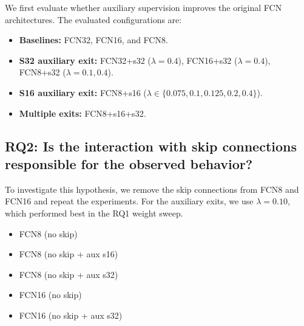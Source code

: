 \documentclass[runningheads]{llncs}
\begin{document}
    

    We first evaluate whether auxiliary supervision improves the original FCN architectures. The evaluated configurations are:

    \begin{itemize}
    \item \textbf{Baselines:} FCN32, FCN16, and FCN8.
    \item \textbf{S32 auxiliary exit:} FCN32+s32 ($\lambda=0.4$), FCN16+s32 ($\lambda=0.4$), FCN8+s32 ($\lambda=0.1,0.4$).
    \item \textbf{S16 auxiliary exit:} FCN8+s16 ($\lambda\in\{0.075,0.1,0.125,0.2,0.4\}$).
    \item \textbf{Multiple exits:} FCN8+s16+s32.
    \end{itemize}

    
    \subsection{RQ2: Is the interaction with skip connections responsible for the observed behavior?}
    
    To investigate this hypothesis, we remove the skip connections from FCN8 and FCN16
    and repeat the experiments. For the auxiliary exits, we use $\lambda=0.10$, which performed best in the RQ1 weight sweep.
    \begin{itemize}
        \item FCN8 (no skip)
        \item FCN8 (no skip + aux s16)
        \item FCN8 (no skip + aux s32)
        \item FCN16 (no skip)
        \item FCN16 (no skip + aux s32)
    \end{itemize}
    
\end{document}
